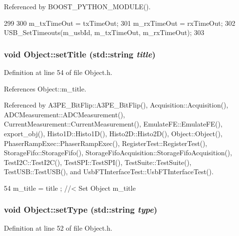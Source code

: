 Referenced by BOOST\_\-PYTHON\_\-MODULE().


\begin{DoxyCode}
299                                                 {
300     m_txTimeOut = txTimeOut;
301     m_rxTimeOut = rxTimeOut;
302     USB_SetTimeouts(m_usbId, m_txTimeOut, m_rxTimeOut);
303   }
\end{DoxyCode}
\hypertarget{classObject_a89557dbbad5bcaa02652f5d7fa35d20f}{
\subsubsection[{setTitle}]{\setlength{\rightskip}{0pt plus 5cm}void Object::setTitle (std::string {\em title})}}
\label{classObject_a89557dbbad5bcaa02652f5d7fa35d20f}


Definition at line 54 of file Object.h.

References Object::m\_\-title.

Referenced by A3PE\_\-BitFlip::A3PE\_\-BitFlip(), Acquisition::Acquisition(), ADCMeasurement::ADCMeasurement(), CurrentMeasurement::CurrentMeasurement(), EmulateFE::EmulateFE(), export\_\-obj(), Histo1D::Histo1D(), Histo2D::Histo2D(), Object::Object(), PhaserRampExec::PhaserRampExec(), RegisterTest::RegisterTest(), StorageFifo::StorageFifo(), StorageFifoAcquisition::StorageFifoAcquisition(), TestI2C::TestI2C(), TestSPI::TestSPI(), TestSuite::TestSuite(), TestUSB::TestUSB(), and UsbFTInterfaceTest::UsbFTInterfaceTest().


\begin{DoxyCode}
54 { m_title = title ; } //< Set Object m_title
\end{DoxyCode}
\hypertarget{classObject_aae534cc9d982bcb9b99fd505f2e103a5}{
\subsubsection[{setType}]{\setlength{\rightskip}{0pt plus 5cm}void Object::setType (std::string {\em type})}}
\label{classObject_aae534cc9d982bcb9b99fd505f2e103a5}


Definition at line 52 of file Object.h.

